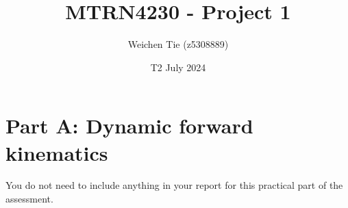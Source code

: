 \documentclass[12pt]{article}
\title{MTRN4230 - Project 1}
\author{Weichen Tie (z5308889)}
\date{T2 July 2024}
\begin{document}
\maketitle
\tableofcontents
\section{Part A: Dynamic forward kinematics}
You do not need to include anything in your report for this practical part of the assessment.





\end{document}
